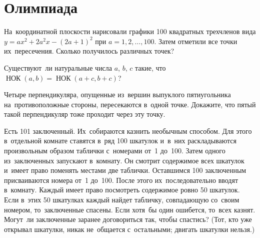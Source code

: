 

\section*{Олимпиада}


\begingroup %
\renewcommand\gcd{\operatorname{\text{НОК}}}

\begin{problems}

\item
На~координатной плоскости нарисовали графики 100 квадратных трехчленов вида
$y = a x^2 + 2 a^2 x - (2 a + 1)^2$ при $a = 1, 2, \ldots, 100$.
Затем отметили все точки их~пересечения.
Сколько получилось различных точек?

\item
Существуют~ли натуральные числа $a$, $b$, $c$ такие, что
$\gcd(a, b) = \gcd(a + c, b + c)$?

\item
Четыре перпендикуляра, опущенные из~вершин выпуклого пятиугольника
на~противоположные стороны, пересекаются в~одной точке.
Докажите, что пятый такой перпендикуляр тоже проходит через эту точку.

\item
Есть 101 заключенный.
Их~собираются казнить необычным способом.
Для этого в~отдельной комнате ставятся в~ряд 100 шкатулок и~в~них
раскладываются произвольным образом таблички с~номерами от~1 до~100.
Затем одного из~заключенных запускают в~комнату.
Он смотрит содержимое всех шкатулок и~имеет право поменять местами две
таблички.
Оставшимся 100 заключенным присваиваются номера от~1 до~100.
После этого их~последовательно вводят в~комнату.
Каждый имеет право посмотреть содержимое ровно 50 шкатулок.
Если в~этих 50 шкатулках каждый найдет табличку, совпадающую со~своим номером,
то~заключенные спасены.
Если хотя~бы один ошибется, то~всех казнят.
Могут~ли заключенные заранее договориться так, чтобы спастись?
(Тот, кто уже открывал шкатулки, никак не~общается с~остальными;
двигать шкатулки нельзя.)

\end{problems}

\endgroup %

